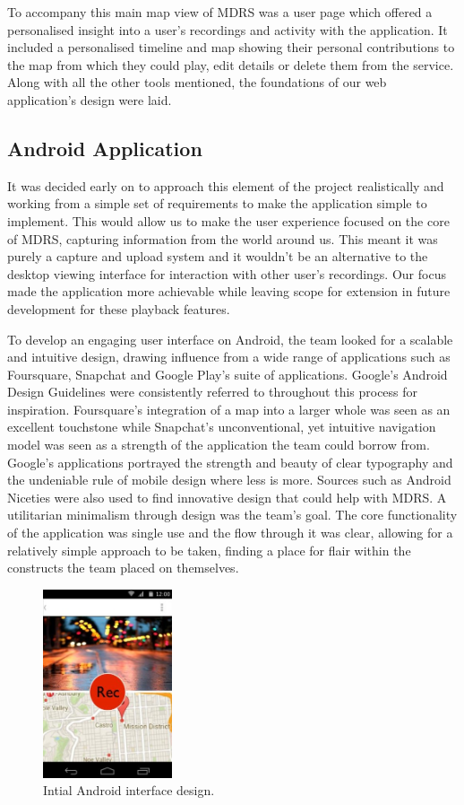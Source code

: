\documentclass{l3proj}
\begin{document}
To accompany this main map view of MDRS was a user page which offered a
personalised insight into a user's recordings and activity with the application.
It included a personalised timeline and map showing their personal contributions
to the map from which they could play, edit details or delete them from the
service. Along with all the other tools mentioned, the foundations of our
web application's design were laid.

\subsection{Android Application} It was decided early on to approach this
element of the project realistically and working from a simple set of requirements to
make the application simple to implement. This would allow us to make the user experience focused on the core of MDRS, capturing information from the world around us. This meant it was purely a capture and upload system and it wouldn't be an alternative to the desktop viewing interface for interaction with other user's recordings. Our focus made the application more achievable while leaving scope for extension in future development for these playback features.

To develop an engaging user interface on Android, the team looked for a scalable and intuitive design, drawing influence from a wide range of applications such as Foursquare, Snapchat and Google Play’s suite of applications. Google's Android Design Guidelines were consistently referred to throughout this process for inspiration.  Foursquare's integration of a map into a larger whole was seen as an excellent touchstone while Snapchat's unconventional, yet intuitive navigation model was seen as a strength of the application the team could borrow from. Google's applications portrayed the strength and beauty of clear typography and the undeniable rule of mobile design where less is more. Sources such as Android Niceties were also used to find innovative design that could help with MDRS. A utilitarian minimalism through design was the team's goal. The core functionality of the application was single use and the flow through it was clear, allowing for a relatively simple approach to be taken, finding a place for flair within the constructs the team placed on themselves.

\begin{figure}[ht!]
\centering
\includegraphics[width=0.34\textwidth]{images/android-digital-prototype-1.jpg}
\caption{Intial Android interface design.}
\end{figure}
\end{document}
